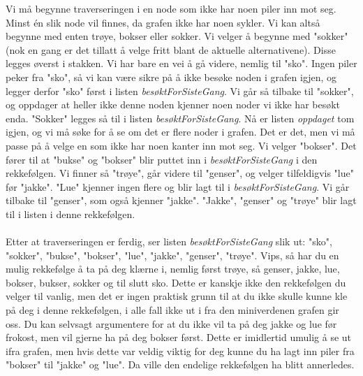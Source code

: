 \begin{boxed}
Vi må begynne traverseringen i en node som ikke har noen piler inn mot seg. Minst én slik node vil finnes, da grafen ikke har noen sykler. Vi kan altså begynne med enten trøye, bokser eller sokker.\newline\newline
Vi velger å begynne med "sokker" (nok en gang er det tillatt å velge fritt blant de aktuelle alternativene). Disse legges øverst i stakken. Vi har bare en vei å gå videre, nemlig til "sko". Ingen piler peker fra "sko", så vi kan være sikre på å ikke besøke noden i grafen igjen, og legger derfor "sko" først i listen \textit{besøktForSisteGang}. Vi går så tilbake til "sokker", og oppdager at heller ikke denne noden kjenner noen noder vi ikke har besøkt enda. "Sokker" legges så til i listen \textit{besøktForSisteGang}. Nå er listen \textit{oppdaget} tom igjen, og vi må søke for å se om det er flere noder i grafen. Det er det, men vi må passe på å velge en som ikke har noen kanter inn mot seg. Vi velger "bokser". Det fører til at "bukse" og "bokser" blir puttet inn i \textit{besøktForSisteGang} i den rekkefølgen. Vi finner så "trøye", går videre til "genser", og velger tilfeldigvis "lue" før "jakke". "Lue" kjenner ingen flere og blir lagt til i \textit{besøktForSisteGang}. Vi går tilbake til "genser", som også kjenner "jakke". "Jakke", "genser" og "trøye" blir lagt til i listen i denne rekkefølgen.
\\\\
Etter at traverseringen er ferdig, ser listen \textit{besøktForSisteGang} slik ut: "sko", "sokker", "bukse", "bokser", "lue", "jakke", "genser", "trøye". Vips, så har du en mulig rekkefølge å ta på deg klærne i, nemlig først trøye, så genser, jakke, lue, bokser, bukser, sokker og til slutt sko. Dette er kanskje ikke den rekkefølgen du velger til vanlig, men det er ingen praktisk grunn til at du ikke skulle kunne kle på deg i denne rekkefølgen, i alle fall ikke ut i fra den miniverdenen grafen gir oss. Du kan selvsagt argumentere for at du ikke vil ta på deg jakke og lue før frokost, men vil gjerne ha på deg bokser først. Dette er imidlertid umulig å se ut ifra grafen, men hvis dette var veldig viktig for deg kunne du ha lagt inn piler fra "bokser" til "jakke" og "lue". Da ville den endelige rekkefølgen ha blitt annerledes.
\end{boxed}